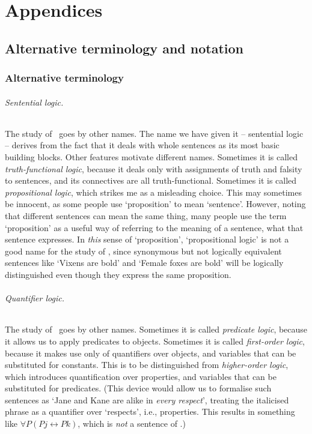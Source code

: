 \part*{Appendices}


\chapter{Alternative terminology and notation}\label{app.notation}

\section*{Alternative terminology}
\paragraph{Sentential logic.} The study of \TFL\ goes by other names. The name we have given it – sentential logic – derives from the fact that it deals with whole sentences as its most basic building blocks. Other features motivate different names.  Sometimes it is called \emph{truth-functional logic}, because it deals only with assignments of truth and falsity to sentences, and its connectives are all truth-functional. Sometimes it is called \emph{propositional logic}, which strikes me as a misleading choice. This may sometimes be innocent, as some people  use `proposition' to mean `sentence'. However, noting that different sentences can mean the same thing, many people use the term  `proposition' as a useful way of referring to the meaning of a sentence, what that sentence expresses. In \emph{this} sense of `proposition', `propositional logic' is not a good name for the study of \TFL, since synonymous but not logically equivalent sentences like `Vixens are bold' and `Female foxes are bold' will be logically distinguished even though they express the same proposition.


\paragraph{Quantifier logic.} The study of \FOL\ goes by other names. Sometimes it is called \emph{predicate logic}, because it allows us to apply  predicates to objects. Sometimes it is called \emph{first-order logic}, because it makes use only of quantifiers over objects, and variables that can be substituted for constants. This is to be distinguished from \emph{higher-order logic}, which introduces quantification over properties, and variables that can be substituted for predicates. (This device would allow us to formalise such sentences as `Jane and Kane are alike in \emph{every respect}', treating the italicised phrase as a quantifier over `respects', i.e., properties. This results in something like $\forall P (Pj \leftrightarrow Pk)$, which is \emph{not} a sentence of \FOL.)

